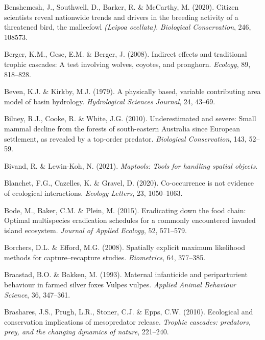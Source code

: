 \documentclass[11pt,a4paper,titlepage,twoside,openright]{style/unimelbthesis}
\begin{document}
\begin{mainmatter}
\leavevmode\hypertarget{ref-benshemesh2020citizen}{}%
Benshemesh, J., Southwell, D., Barker, R. \& McCarthy, M. (2020). Citizen scientists reveal nationwide trends and drivers in the breeding activity of a threatened bird, the malleefowl \emph{(Leipoa ocellata)}. \emph{Biological Conservation}, 246, 108573.

\leavevmode\hypertarget{ref-berger2008indirect}{}%
Berger, K.M., Gese, E.M. \& Berger, J. (2008). Indirect effects and traditional trophic cascades: A test involving wolves, coyotes, and pronghorn. \emph{Ecology}, 89, 818--828.

\leavevmode\hypertarget{ref-beven1979physically}{}%
Beven, K.J. \& Kirkby, M.J. (1979). A physically based, variable contributing area model of basin hydrology. \emph{Hydrological Sciences Journal}, 24, 43--69.

\leavevmode\hypertarget{ref-bilney2010underestimated}{}%
Bilney, R.J., Cooke, R. \& White, J.G. (2010). Underestimated and severe: Small mammal decline from the forests of south-eastern Australia since European settlement, as revealed by a top-order predator. \emph{Biological Conservation}, 143, 52--59.

\leavevmode\hypertarget{ref-maptools}{}%
Bivand, R. \& Lewin-Koh, N. (2021). \emph{Maptools: Tools for handling spatial objects}.

\leavevmode\hypertarget{ref-guillaume2020co}{}%
Blanchet, F.G., Cazelles, K. \& Gravel, D. (2020). Co-occurrence is not evidence of ecological interactions. \emph{Ecology Letters}, 23, 1050--1063.

\leavevmode\hypertarget{ref-bode2015eradicating}{}%
Bode, M., Baker, C.M. \& Plein, M. (2015). Eradicating down the food chain: Optimal multispecies eradication schedules for a commonly encountered invaded island ecosystem. \emph{Journal of Applied Ecology}, 52, 571--579.

\leavevmode\hypertarget{ref-borchers2008spatially}{}%
Borchers, D.L. \& Efford, M.G. (2008). Spatially explicit maximum likelihood methods for capture--recapture studies. \emph{Biometrics}, 64, 377--385.

\leavevmode\hypertarget{ref-braastad1993maternal}{}%
Braastad, B.O. \& Bakken, M. (1993). Maternal infanticide and periparturient behaviour in farmed silver foxes Vulpes vulpes. \emph{Applied Animal Behaviour Science}, 36, 347--361.

\leavevmode\hypertarget{ref-brashares2010ecological}{}%
Brashares, J.S., Prugh, L.R., Stoner, C.J. \& Epps, C.W. (2010). Ecological and conservation implications of mesopredator release. \emph{Trophic cascades: predators, prey, and the changing dynamics of nature}, 221--240.


\end{mainmatter}
\end{document}
